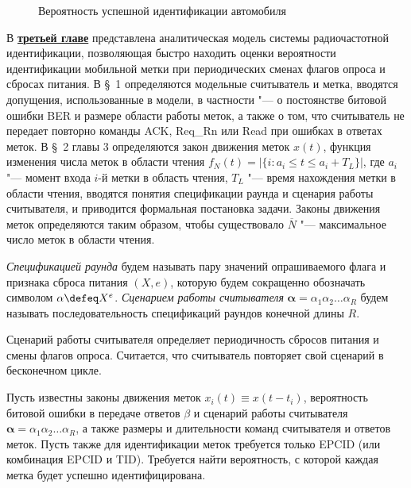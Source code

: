 \begin{figure}[ht]
  \caption{Вероятность успешной идентификации автомобиля}\label{fig:vehicle_identification_rate}
\end{figure}




В \underline{\textbf{третьей главе}} представлена аналитическая модель системы радиочастотной идентификации, позволяющая быстро находить оценки вероятности идентификации мобильной метки при периодических сменах флагов опроса и сбросах питания. В \S~1 определяются модельные считыватель и метка, вводятся допущения, использованные в модели, в частности "--- о постоянстве битовой ошибки BER и размере области работы меток, а также о том, что считыватель не передает повторно команды ACK, Req\_Rn или Read при ошибках в ответах меток. В \S~2 главы 3 определяются закон движения меток $x(t)$, функция изменения числа меток в области чтения $f_N(t) = | \{ i: a_i \leqslant t \leqslant a_i + T_L \} |$, где $a_i$ "--- момент входа $i$-й метки в область чтения, $T_L$ "--- время нахождения метки в области чтения, вводятся понятия спецификации раунда и сценария работы считывателя, и приводится формальная постановка задачи. Законы движения меток определяются таким образом, чтобы существовало $\overline{N}$ "--- максимальное число меток в области чтения.

\begin{defn}
\textit{Спецификацией раунда} будем называть пару значений опрашиваемого флага и признака сброса питания $(X, e)$, которую будем сокращенно обозначать символом $\alpha \defeq X^{e}$. \textit{Сценарием работы считывателя} $\bm{\alpha} = \alpha_1 \alpha_2 \dots \alpha_R$ будем называть последовательность спецификаций раундов конечной длины $R$.
\end{defn}

Сценарий работы считывателя определяет периодичность сбросов питания и смены флагов опроса. Считается, что считыватель повторяет свой сценарий в бесконечном цикле.

\begin{probl}\label{probl:analytic_problem}
  Пусть известны законы движения меток $x_i(t) \equiv x(t - t_i)$, вероятность битовой ошибки в передаче ответов $\beta$ и сценарий работы считывателя $\bm{\alpha} = \alpha_1 \alpha_2 \dots \alpha_R$, а также размеры и длительности команд считывателя и ответов меток. Пусть также для идентификации меток требуется только EPCID (или комбинация EPCID и TID). Требуется найти вероятность, с которой каждая метка будет успешно идентифицирована.
\end{probl}

